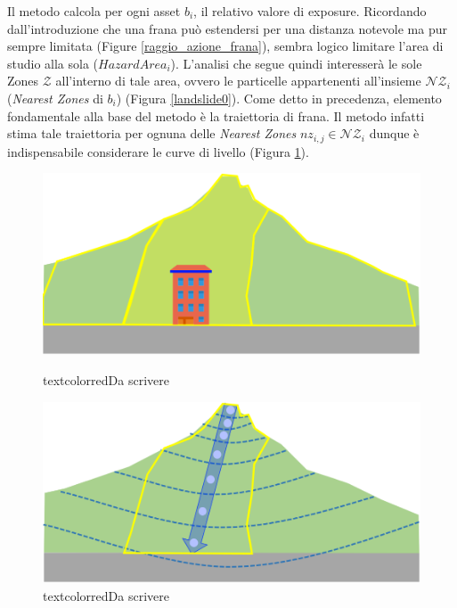 Il metodo calcola per ogni asset $b_i$, il relativo valore di exposure. Ricordando dall'introduzione che una frana può estendersi per una distanza notevole ma pur sempre limitata (Figure \ref{raggio_azione_frana}), sembra logico limitare l'area di studio alla sola ($HazardArea_i$). L'analisi che segue quindi interesserà le sole Zones $\mathcal{Z}$ all'interno di tale area, ovvero le particelle appartenenti all'insieme $\mathcal{NZ}_i$ (\textit{Nearest Zones} di $b_i$) (Figura \ref{landslide0}).
Come detto in precedenza, elemento fondamentale alla base del metodo è la  traiettoria di frana. Il metodo infatti stima tale traiettoria per ognuna delle \textit{Nearest Zones} $nz_{i,j} \in \mathcal{NZ}_i$ dunque è indispensabile considerare le curve di livello  (Figura \ref{landslide1}). 

\begin{figure}[h]
	\hspace{0.05\linewidth}
	\begin{minipage}[t]{0.4\linewidth}
		\centering
		\includegraphics[width=\textwidth]{images/landslide0}
		\caption{textcolor{red}{Da scrivere}}
		\label{landslide0}
	\end{minipage}
	\hspace{0.05\linewidth}
	\begin{minipage}[t]{0.4\linewidth}
		\centering
		\includegraphics[width=\textwidth]{images/landslide1}
		\caption{textcolor{red}{Da scrivere}}
		\label{landslide1}
	\end{minipage}
\end{figure}

